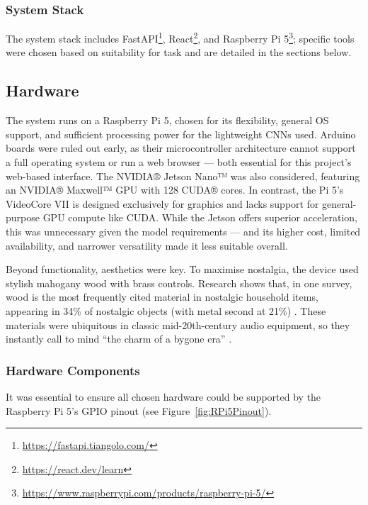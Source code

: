             \subsubsection{System Stack}
    
                The system stack includes FastAPI\footnote{\url{https://fastapi.tiangolo.com/}}, React\footnote{\url{https://react.dev/learn}}, and Raspberry Pi 5\footnote{\url{https://www.raspberrypi.com/products/raspberry-pi-5/}}; specific tools were chosen based on suitability for task and are detailed in the sections below.
    
    
        \subsection{Hardware}
    
            The system runs on a Raspberry Pi 5, chosen for its flexibility, general OS support, and sufficient processing power for the lightweight CNNs used. Arduino boards were ruled out early, as their microcontroller architecture cannot support a full operating system or run a web browser — both essential for this project’s web-based interface. The NVIDIA® Jetson Nano™ was also considered, featuring an NVIDIA® Maxwell™ GPU with 128 CUDA® cores. In contrast, the Pi 5’s VideoCore VII is designed exclusively for graphics and lacks support for general-purpose GPU compute like CUDA. While the Jetson offers superior acceleration, this was unnecessary given the model requirements — and its higher cost, limited availability, and narrower versatility made it less suitable overall.
            
            Beyond functionality, aesthetics were key. To maximise nostalgia, the device used stylish mahogany wood with brass controls. Research shows that, in one survey, wood is the most frequently cited material in nostalgic household items, appearing in 34\% of nostalgic objects (with metal second at 21\%) \cite{Skinner2022}. These materials were ubiquitous in classic mid-20th-century audio equipment, so they instantly call to mind ``the charm of a bygone era'' \cite{LookInTheAttic2024}.
    
            \subsubsection{Hardware Components}
    
                It was essential to ensure all chosen hardware could be supported by the Raspberry Pi 5's GPIO pinout (see Figure~\ref{fig:RPi5Pinout}).
    
